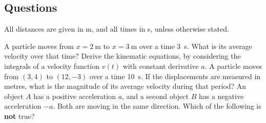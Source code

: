 \subsection*{Questions}
All distances are given in \si{\metre}, and all times in \si{\second}, unless otherwise stated.
\begin{questions}
  \questioA A particle moves from $ x = \SI{2}{\metre} $ to $ x = \SI{3}{\metre} $ over a time \SI{3}{\second}. What is its average velocity over that time?
  \questioM Derive the kinematic equations, by considering the integrals of a velocity function $ v(t) $ with constant derivative $ a $.
  \questioA A particle moves from $ (3,4) $ to $ (12,-3) $ over a time \SI{10}{\second}. If the displacements are measured in metres, what is the magnitude of
            its average velocity during that period?
  \questioA An object $ A $ has a positive acceleration $ a $, and a second object $ B $ has a negative acceleration $ -a $. Both are moving in the
            same direction. Which of the following is \textbf{not} true?
\end{questions}
